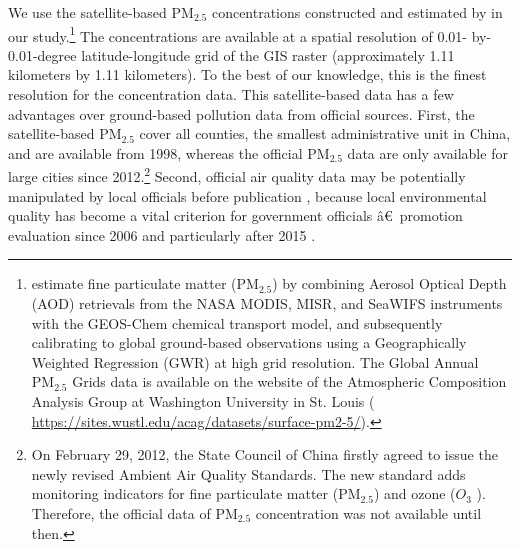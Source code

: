 \documentclass[12pt]{article}
\begin{document}
We use the satellite-based $\mathrm{PM_{2.5}}$ concentrations constructed
and estimated by \cite{van2021monthly} in our study.\footnote{\cite%
{van2021monthly} estimate fine particulate matter ($\mathrm{PM_{2.5}}$) by
combining Aerosol Optical Depth (AOD) retrievals from the NASA MODIS, MISR,
and SeaWIFS instruments with the GEOS-Chem chemical transport model, and
subsequently calibrating to global ground-based observations using a
Geographically Weighted Regression (GWR) at high grid resolution. The Global
Annual $\mathrm{PM_{2.5}}$ Grids data is available on the website of the
Atmospheric Composition Analysis Group at Washington University in St. Louis
( \url{https://sites.wustl.edu/acag/datasets/surface-pm2-5/}).} The
concentrations are available at a spatial resolution of 0.01- by-0.01-degree
latitude-longitude grid of the GIS raster (approximately 1.11 kilometers by
1.11 kilometers). To the best of our knowledge, this is the finest
resolution for the concentration data. This satellite-based data has a few
advantages over ground-based pollution data from official sources. First,
the satellite-based $\mathrm{PM_{2.5}}$ cover all counties, the smallest
administrative unit in China, and are available from 1998, whereas the
official $\mathrm{PM_{2.5}}$ data are only available for large cities since
2012.\footnote{%
On February 29, 2012, the State Council of China firstly agreed to issue the
newly revised Ambient Air Quality Standards. The new standard adds
monitoring indicators for fine particulate matter ($\mathrm{PM_{2.5}}$) and
ozone ($O_{3}$ ). Therefore, the official data of $\mathrm{PM_{2.5}}$
concentration was not available until then.} Second, official air quality
data may be potentially manipulated by local officials before publication %
\citep{ghanem2014effortless,andrews2008inconsistencies}, because local
environmental quality has become a vital criterion for government officials%
\^{a}\euro \texttrademark\ promotion evaluation since 2006 and particularly
after 2015 \citep{Fan2022}.
\end{document}
